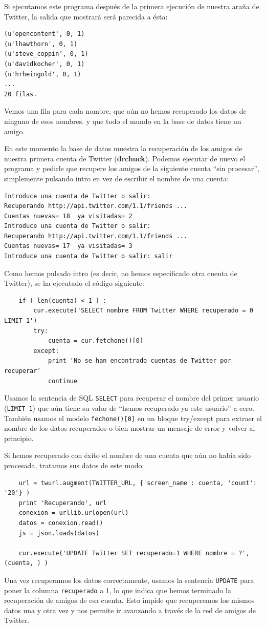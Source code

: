 Si ejecutamos este programa después de la primera ejecución de nuestra araña
de Twitter, la salida que mostrará será parecida a ésta:

\beforeverb
\begin{verbatim}
(u'opencontent', 0, 1)
(u'lhawthorn', 0, 1)
(u'steve_coppin', 0, 1)
(u'davidkocher', 0, 1)
(u'hrheingold', 0, 1)
...
20 filas.
\end{verbatim}
\afterverb
%
Vemos una fila para cada nombre, que aún no hemos
recuperado los datos de ninguno de esos nombres, y
que todo el mundo en la base de datos tiene un amigo.

En este momento la base de datos muestra la recuperación de los amigos de
nuestra primera cuenta de Twitter ({\bf drchuck}). Podemos ejecutar de nuevo
el programa y pedirle que recupere los amigos de la siguiente
cuenta ``sin procesar'', simplemente pulsando intro en vez de
escribir el nombre de una cuenta:

\beforeverb
\begin{verbatim}
Introduce una cuenta de Twitter o salir:  
Recuperando http://api.twitter.com/1.1/friends ...
Cuentas nuevas= 18  ya visitadas= 2
Introduce una cuenta de Twitter o salir: 
Recuperando http://api.twitter.com/1.1/friends ...
Cuentas nuevas= 17  ya visitadas= 3
Introduce una cuenta de Twitter o salir: salir
\end{verbatim}
\afterverb
%
Como hemos pulsado intro (es decir, no hemos especificado otra cuenta de Twitter),
se ha ejecutado el código siguiente:

\beforeverb
\begin{verbatim}
    if ( len(cuenta) < 1 ) :
        cur.execute('SELECT nombre FROM Twitter WHERE recuperado = 0 LIMIT 1')
        try:
            cuenta = cur.fetchone()[0]
        except:
            print 'No se han encontrado cuentas de Twitter por recuperar'
            continue
\end{verbatim}
\afterverb
%
Usamos la sentencia de SQL {\tt SELECT} para recuperar el nombre del primer
usuario ({\tt LIMIT 1}) que aún tiene su valor de ``hemos recuperado ya este usuario''
a cero. También usamos el modelo {\tt fechone()[0]} en un bloque
try/except para extraer el nombre de los datos recuperados o bien
mostrar un mensaje de error y volver al principio.

Si hemos recuperado con éxito el nombre de una cuenta que aún no había sido procesada,
tratamos sus datos de este modo:

\beforeverb
\begin{verbatim}
    url = twurl.augment(TWITTER_URL, {'screen_name': cuenta, 'count': '20'} )
    print 'Recuperando', url
    conexion = urllib.urlopen(url)
    datos = conexion.read()
    js = json.loads(datos)

    cur.execute('UPDATE Twitter SET recuperado=1 WHERE nombre = ?', (cuenta, ) )
\end{verbatim}
\afterverb
%
Una vez recuperamos los datos correctamente, usamos la sentencia {\tt UPDATE}
para poner la columna {\tt recuperado} a 1, lo que indica que hemos terminado
la recuperación de amigos de esa cuenta. Esto impide que recuperemos los
mismos datos una y otra vez y nos permite ir avanzando a través de la red
de amigos de Twitter. 

